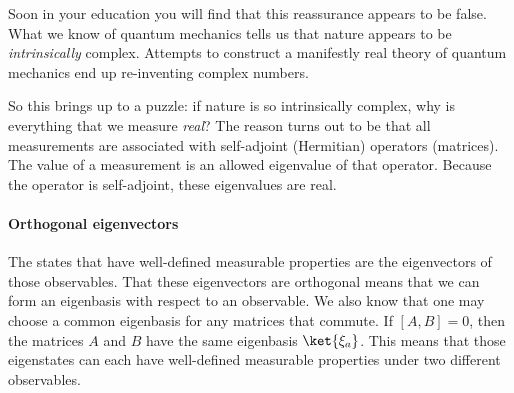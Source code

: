 Soon in your education you will find that this reassurance appears to be false. What we know of quantum mechanics tells us that nature appears to be \emph{intrinsically} complex. Attempts to construct a manifestly real theory of quantum mechanics end up re-inventing complex numbers.

So this brings up to a puzzle: if nature is so intrinsically complex, why is everything that we measure \emph{real}? The reason turns out to be that all measurements are associated with self-adjoint (Hermitian) operators (matrices). The value of a measurement is an allowed eigenvalue of that operator. Because the operator is self-adjoint, these eigenvalues are real. 

\paragraph{Orthogonal eigenvectors} The states that have well-defined measurable properties are the eigenvectors of those observables. That these eigenvectors are orthogonal means that we can form an eigenbasis with respect to an observable. We also know that one may choose a common eigenbasis for any matrices that commute. If $[A,B]=0$, then the matrices $A$ and $B$ have the same eigenbasis $\ket{\xi_a}$. This means that those eigenstates can each have well-defined measurable properties under two different observables. 
